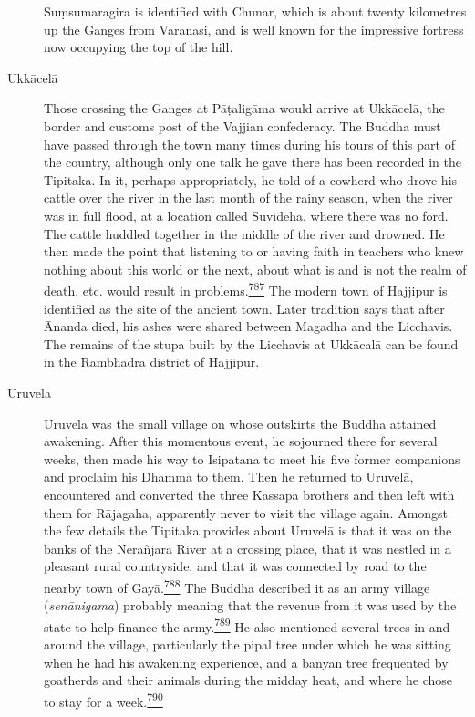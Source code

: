 \begin{description}
Suṃsumaragira is identified with Chunar, which is about twenty
kilometres up the Ganges from Varanasi, and is well known for the
impressive fortress now occupying the top of the hill.
\item[Ukkācelā]
Those crossing the Ganges at Pāṭaligāma would arrive at Ukkācelā, the
border and customs post of the Vajjian confederacy. The Buddha must have
passed through the town many times during his tours of this part of the
country, although only one talk he gave there has been recorded in the
Tipitaka. In it, perhaps appropriately, he told of a cowherd who drove
his cattle over the river in the last month of the rainy season, when
the river was in full flood, at a location called Suvidehā, where there
was no ford. The cattle huddled together in the middle of the river and
drowned. He then made the point that listening to or having faith in
teachers who knew nothing about this world or the next, about what is
and is not the realm of death, etc. would result in
problems.\label{footprints_split_019.html_fnref787}\hyperref[footprints_split_025.htmlux5cux23fn787]{\textsuperscript{787}}
The modern town of Hajjipur is identified as the site of the ancient
town. Later tradition says that after Ānanda died, his ashes were shared
between Magadha and the Licchavis. The remains of the stupa built by the
Licchavis at Ukkācalā can be found in the Rambhadra district of
Hajjipur.
\item[Uruvelā]
Uruvelā was the small village on whose outskirts the Buddha attained
awakening. After this momentous event, he sojourned there for several
weeks, then made his way to Isipatana to meet his five former companions
and proclaim his Dhamma to them. Then he returned to Uruvelā,
encountered and converted the three Kassapa brothers and then left with
them for Rājagaha, apparently never to visit the village again. Amongst
the few details the Tipitaka provides about Uruvelā is that it was on
the banks of the Nerañjarā River at a crossing place, that it was
nestled in a pleasant rural countryside, and that it was connected by
road to the nearby town of
Gayā.\label{footprints_split_019.html_fnref788}\hyperref[footprints_split_025.htmlux5cux23fn788]{\textsuperscript{788}}
The Buddha described it as an army village (\emph{senānigama}) probably
meaning that the revenue from it was used by the state to help finance
the
army.\label{footprints_split_019.html_fnref789}\hyperref[footprints_split_025.htmlux5cux23fn789]{\textsuperscript{789}}
He also mentioned several trees in and around the village, particularly
the pipal tree under which he was sitting when he had his awakening
experience, and a banyan tree frequented by goatherds and their animals
during the midday heat, and where he chose to stay for a
week.\label{footprints_split_019.html_fnref790}\hyperref[footprints_split_025.htmlux5cux23fn790]{\textsuperscript{790}}


\end{description}
